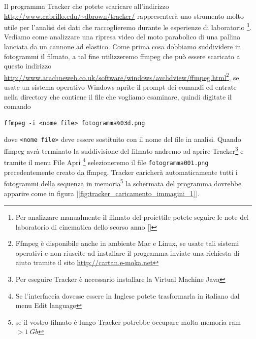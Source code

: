 \documentclass[a4paper,10pt,oneside]{article}
\begin{document}
Il programma Tracker che potete scaricare all'indirizzo \url{http://www.cabrillo.edu/~dbrown/tracker/} rappresenterà uno strumento molto utile per l'analisi dei dati che raccoglieremo durante le esperienze di laboratorio \footnote{Per analizzare manualmente il filmato del proiettile potete seguire le note del laboratorio di cinematica dello scorso anno [\cite{Laboratorio7}]}. Vediamo come analizzare una ripresa video del moto parabolico di una pallina lanciata da un cannone ad elastico.
Come prima cosa dobbiamo suddividere in fotogrammi il filmato, a tal fine utilizzeremo ffmpeg che può essere scaricato a questo indirizzo \url{http://www.arachneweb.co.uk/software/windows/avchdview/ffmpeg.html}\footnote{Ffmpeg è disponibile anche in ambiente Mac e Linux, se usate tali sistemi operativi e non riuscite ad installare il programma inviate una richiesta di aiuto tramite il sito \url{http://cartan.e-moka.net}}, se usate un sistema operativo Windows aprite il prompt dei comandi ed entrate nella directory che contiene il file che vogliamo esaminare, quindi digitate il comando
\begin{verbatim}
ffmpeg -i <nome file> fotogramma%03d.png
\end{verbatim}
dove \verb#<nome file># deve essere sostituito con il nome del file in analisi.
Quando ffmpeg avrà terminato la suddivisione del filmato andremo ad aprire Tracker\footnote{Per eseguire Tracker è necessario installare la Virtual Machine Java} e tramite il menu File \RIGHTarrow Apri \footnote{Se l'interfaccia dovesse essere in Inglese potete trasformarla in italiano dal menu Edit \RIGHTarrow language} selezioneremo il file \verb#fotogramma001.png# precedentemente creato da ffmpeg. Tracker caricherà automaticamente tutti i fotogrammi della sequenza in memoria\footnote{se il vostro filmato è lungo Tracker potrebbe occupare molta memoria ram $>1\ Gb$} la schermata del programma dovrebbe apparire come in figura [\ref{fig:tracker_caricamento_immagini_1}].
\end{document}
